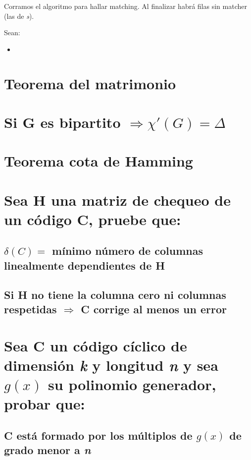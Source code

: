 \documentclass[12pt,a4paper]{report}
\begin{document}
			\vspace{5 mm}
			Corramos el algoritmo para hallar matching. Al finalizar habrá filas sin matcher (las de \textit{s}).
			
			Sean:
			\begin{itemize}
				\item 
			\end{itemize}
	
	\section{Teorema del matrimonio}
	
	
	\section{Si G es bipartito $\Rightarrow \chi '(G) = \Delta $}

	
	\section{Teorema cota de Hamming}
	
	
	\section{Sea H una matriz de chequeo de un código C, pruebe que:}
	
		\subsection{$\delta (C) =$ mínimo número de columnas linealmente dependientes de H}
		
		\subsection{Si H no tiene la columna cero ni columnas respetidas $\Rightarrow$ C corrige al menos un error}


	\section{Sea C un código cíclico de dimensión \textit{k} y longitud \textit{n} y sea $g(x)$ su polinomio generador, probar que:}
	
		\subsection{C está formado por los múltiplos de $g(x)$ de grado menor a \textit{n}}
		
\end{document}
